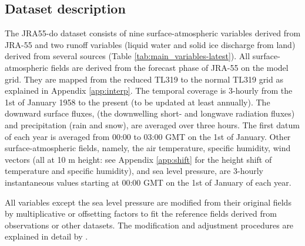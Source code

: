\documentclass[dvipdfmx]{elsarticle_mod}
\begin{document}
\subsection{Dataset description}

The JRA55-do dataset consists of nine surface-atmospheric variables derived from JRA-55 and two runoff variables (liquid water and solid ice discharge from land) derived from several sources (Table \ref{tab:main_variables-latest}). All surface-atmospheric fields are derived from the forecast phase of JRA-55 on the model grid. They are mapped from the reduced TL319 to the normal TL319 grid as explained in Appendix \ref{app:interp}. The temporal coverage is 3-hourly from the 1st of January 1958 to the present (to be updated at least annually). The downward surface fluxes, (the downwelling short- and longwave radiation fluxes) and precipitation (rain and snow), are averaged over three hours. The first datum of each year is averaged from 00:00 to 03:00 GMT on the 1st of January. Other surface-atmospheric fields, namely, the air temperature, specific humidity, wind vectors (all at 10 m height: see Appendix \ref{app:shift} for the height shift of temperature and specific humidity), and sea level pressure, are 3-hourly instantaneous values starting at 00:00 GMT on the 1st of January of each year.

All variables except the sea level pressure are modified from their original fields by multiplicative or offsetting factors to fit the reference fields derived from observations or other datasets. The modification and adjustment procedures are explained in detail by \citet{Tsujino_et_al_2018}.
\end{document}
